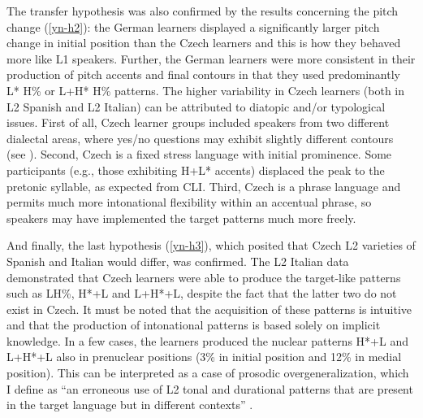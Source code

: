 The transfer hypothesis was also confirmed by the results concerning the pitch change (\ref{yn-h2}): the German learners displayed a significantly larger pitch change in initial position than the Czech learners and this is how they behaved more like L1 speakers. Further, the German learners were more consistent in their production of pitch accents and final contours in that they used predominantly L* H\% or L+H* H\% patterns. The higher variability in Czech learners (both in L2 Spanish and L2 Italian) can be attributed to diatopic and/or typological issues. First of all, Czech learner groups included speakers from two different dialectal areas, where yes/no questions may exhibit slightly different contours (see \citealt{PeškováEtAl2018}). Second, Czech is a fixed stress language with initial prominence. Some participants (e.g., those exhibiting H+L* accents) displaced the peak to the pretonic syllable, as expected from CLI. Third, Czech is a phrase language and permits much more intonational flexibility within an accentual phrase, so speakers may have implemented the target patterns much more freely.



And finally, the last hypothesis (\ref{yn-h3}), which posited that Czech L2 varieties of Spanish and Italian would differ, was confirmed. The L2 Italian data demonstrated that Czech learners were able to produce the target-like patterns such as LH\%, H*+L and L+H*+L, despite the fact that the latter two do not exist in Czech. It must be noted that the acquisition of these patterns is intuitive and that the production of intonational patterns is based solely on implicit knowledge. In a few cases, the learners produced the nuclear patterns H*+L and L+H*+L also in prenuclear positions (3\% in initial position and 12\% in medial position). This can be interpreted as a case of prosodic overgeneralization, which I define as “an erroneous use of L2 tonal and durational patterns that are present in the target language but in different contexts” \citep[1932]{Pešková2019}.



